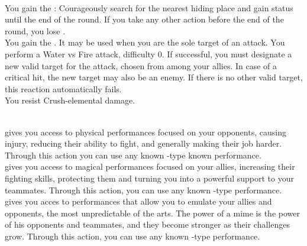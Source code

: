 \begin{tabjob}
     \\
    \tabjobspec{}

         You gain the \actype{} : Courageously search for the nearest hiding place and gain  status until the end of the round. If you take any other action before the end of the round, you lose . \\

         You gain the  . It may be used when you are the sole target of an attack. You perform a Water vs Fire attack, difficulty 0. If successful, you must designate a new valid target for the attack, chosen from among your allies. In case of a critical hit, the new target may also be an enemy. If there is no other valid target, this reaction automatically fails. \\

         You resist Crush-elemental damage. \\

    \tabjobsep%
    
     \\

         gives you access to physical performances focused on your opponents, causing injury, reducing their ability to fight, and generally making their job harder. Through this action you can use any known -type known performance. \\

         gives you access to magical performances focused on your allies, increasing their fighting skills, protecting them and turning you into a powerful support to your teammates. Through this action, you can use any known -type performance. \\

         gives you acces to performances that allow you to emulate your allies and opponents, the most unpredictable of the arts. The power of a mime is the power of his opponents and teammates, and they become stronger as their challenges grow. Through this action, you can use any known -type performance. \\


\end{tabjob}
